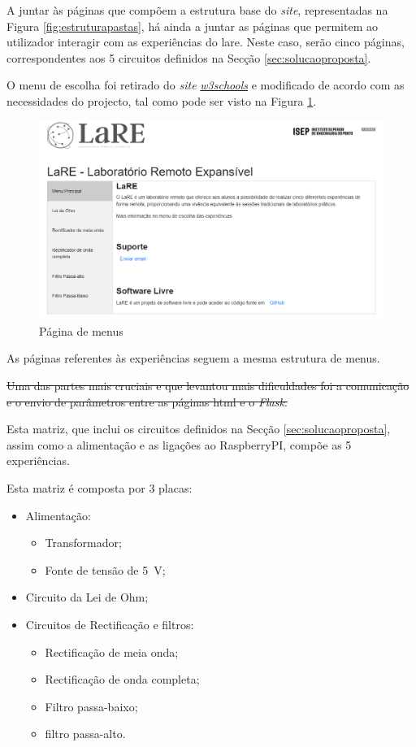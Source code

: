 A juntar às páginas que compõem a estrutura base do \textit{site}, representadas na Figura \ref{fig:estruturapastas}, há ainda a juntar as páginas que permitem ao utilizador interagir com as experiências do \acrshort{lare}. Neste caso, serão cinco páginas, correspondentes aos 5 circuitos definidos na Secção \ref{sec:solucaoproposta}.

O menu de escolha foi retirado do \textit{site} \href{https://www.w3schools.com/howto/howto_js_vertical_tabs.asp}{\textit{w3schools}} e modificado de acordo com as necessidades do projecto, tal como pode ser visto na Figura \ref{fig:pagmenu}.

\begin{figure}[hbtp]
	\centering
	\includegraphics[width=1\textwidth]{figures/menupage.png}
	\caption{Página de menus}
	\label{fig:pagmenu}
\end{figure}

As páginas referentes às experiências seguem a mesma estrutura de menus.

\sout{Uma das partes mais cruciais e que levantou mais dificuldades foi a comunicação e o envio de parâmetros entre as páginas \acrshort{html} e o \textit{Flask}.}

Esta matriz, que inclui os circuitos definidos na Secção \ref{sec:solucaoproposta}, assim como a alimentação e as ligações ao \gls{RaspberryPI}, compõe as 5 experiências.

Esta matriz é composta por 3 placas:
\begin{itemize}
	\item Alimentação:
	      \begin{itemize}
		      \item Transformador;
		      \item Fonte de tensão de \SI{5}{\volt};
	      \end{itemize}
	\item Circuito da Lei de Ohm;
	\item Circuitos de Rectificação e filtros:
	      \begin{itemize}
		      \item Rectificação de meia onda;
		      \item Rectificação de onda completa;
		      \item Filtro passa-baixo;
		      \item filtro passa-alto.
	      \end{itemize}
\end{itemize}